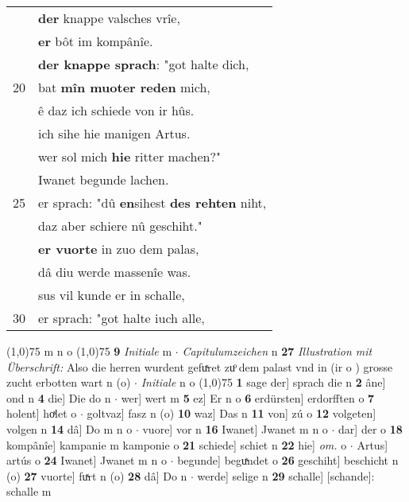 \documentclass[8pt,a4paper,notitlepage]{article}
\begin{document}
\begin{table}[ht]
\begin{minipage}[t]{0.5\linewidth}
\begin{tabular}{rl}
 & \textbf{der} knappe valsches vrîe,\\ 
 & \textbf{er} bôt im kompânîe.\\ 
 & \textbf{der knappe sprach}: "got halte dich,\\ 
20 & bat \textbf{mîn muoter reden} mich,\\ 
 & ê daz ich schiede von ir hûs.\\ 
 & ich sihe hie manigen Artus.\\ 
 & wer sol mich \textbf{hie} ritter machen?"\\ 
 & Iwanet begunde lachen.\\ 
25 & er sprach: "dû \textbf{en}sihest \textbf{des rehten} niht,\\ 
 & daz aber schiere nû geschiht."\\ 
 & \textbf{er vuorte} in zuo dem palas,\\ 
 & dâ diu werde massenîe was.\\ 
 & sus vil kunde er in schalle,\\ 
30 & er sprach: "got halte iuch alle,\\ 
\end{tabular}
\scriptsize
\line(1,0){75} \newline
m n o \newline
\line(1,0){75} \newline
\textbf{9} \textit{Initiale} m   $\cdot$ \textit{Capitulumzeichen} n  \textbf{27} \textit{Illustration mit Überschrift:} Also die herren wurdent gefuͯret zuͦ dem palast vnd in (ir o  ) grosse zucht erbotten wart n (o)   $\cdot$ \textit{Initiale} n o  \newline
\line(1,0){75} \newline
\textbf{1} sage der] sprach die n \textbf{2} âne] ond n \textbf{4} die] Die do n  $\cdot$ wer] wert m \textbf{5} ez] Er n o \textbf{6} erdürsten] erdorfften o \textbf{7} holent] hoͯlet o  $\cdot$ goltvaz] fasz n (o) \textbf{10} waz] Das n \textbf{11} von] zú o \textbf{12} volgeten] volgen n \textbf{14} dâ] Do m n o  $\cdot$ vuore] vor n \textbf{16} Iwanet] Jwanet m n o  $\cdot$ dar] der o \textbf{18} kompânîe] kampanie m kamponie o \textbf{21} schiede] schiet n \textbf{22} hie] \textit{om.} o  $\cdot$ Artus] artús o \textbf{24} Iwanet] Jwanet m n o  $\cdot$ begunde] beguͯndet o \textbf{26} geschiht] beschicht n (o) \textbf{27} vuorte] fuͯrt n (o) \textbf{28} dâ] Do n  $\cdot$ werde] selige n \textbf{29} schalle] [schande]: schalle m \newline
\end{minipage}
\end{table}
\end{document}
